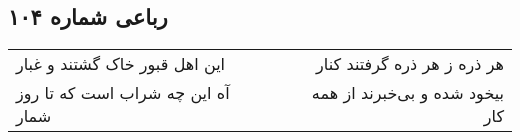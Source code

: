\begin{center}
\section*{رباعی شماره ۱۰۴}
\label{sec:sh104}
\begin{longtable}{l p{0.5cm} r}
این اهل قبور خاک گشتند و غبار
&&
هر ذره ز هر ذره گرفتند کنار
\\
آه این چه شراب است که تا روز شمار
&&
بیخود شده و بی‌خبرند از همه کار
\\
\end{longtable}
\end{center}
